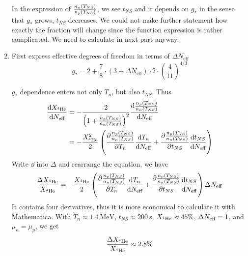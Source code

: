 \begin{enumerate}[label=\alph*)]
      In the expression of $\frac{n_n(T_{NS})}{n_p(T_{NS})}$, we see $t_{NS}$ and it depends on $g_*$ in the sense that $g_*$ grows, $t_{NS}$ decreases. We could not make further statement how exactly the fraction will change since the function expression is rather complicated. We need to calculate in next part anyway.

   \item 
      First express effective degrees of freedom in terms of $\Delta N_{\text{eff}}$
      \begin{equation}
         g_* = 2 + \frac{7}{8} \cdot (3 + \Delta N_\text{eff}) \cdot 2 \cdot \left( \frac{4}{11} \right)^{4/3}
      \end{equation}
      
      $g_*$ dependence enters not only $T_n$, but also $t_{NS}$. Thus
      \begin{align*}
         \dv{X_{{{}^4\text{He}}}}{N_{\text{eff}}} &= - \frac{2}{ \left(1 + \frac{n_p(T_{NS})}{n_n(T_{NS})} \right)^2  } \dv{\frac{n_p(T_{NS})}{n_n(T_{NS})}}{N_{\text{eff}}} \\
                               &= - \frac{X_{{{}^4\text{He}}}^2}{2} \left( \pdv{\frac{n_p(T_{NS})}{n_n(T_{NS})}}{T_n} \dv{T_n}{N_{\text{eff}}} + \pdv{\frac{n_p(T_{NS})}{n_n(T_{NS})}}{t_{NS}}\dv{t_{NS}}{N_{\text{eff}}} \right)
      \end{align*}
      Write $\dd$ into $\Delta$ and rearrange the equation, we have
      \begin{equation}
         \frac{\Delta X_{{}^4\text{He}}}{X_{{}^4\text{He}}} = - \frac{X_{{}^4\text{He}}}{2} \left( \pdv{\frac{n_p(T_{NS})}{n_n(T_{NS})}}{T_n} \dv{T_n}{N_{\text{eff}}} + \pdv{\frac{n_p(T_{NS})}{n_n(T_{NS})}}{t_{NS}}\dv{t_{NS}}{N_{\text{eff}}} \right) \Delta N_{\text{eff}}
      \end{equation}
      It contains four derivatives, thus it is more economical to calculate it with Mathematica. With $T_n \approx \SI{1.4}{\mega\eV}$, $t_{NS}\approx \SI{200}{\s}$, $X_{{}^4\text{He}} \approx 45\% $, $\Delta N_{\text{eff}}=1$, and $\mu_n = \mu_p$, we get 
      \begin{equation}
         \frac{\Delta X_{{}^4\text{He}}}{X_{{}^4\text{He}}} \approx 2.8\%
      \end{equation}
\end{enumerate}
